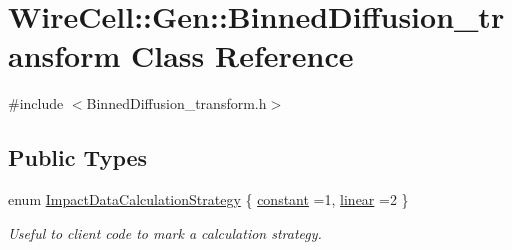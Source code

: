 \hypertarget{class_wire_cell_1_1_gen_1_1_binned_diffusion__transform}{}\section{Wire\+Cell\+:\+:Gen\+:\+:Binned\+Diffusion\+\_\+transform Class Reference}
\label{class_wire_cell_1_1_gen_1_1_binned_diffusion__transform}


{\ttfamily \#include $<$Binned\+Diffusion\+\_\+transform.\+h$>$}

\subsection*{Public Types}
\begin{DoxyCompactItemize}
\item 
enum \hyperlink{class_wire_cell_1_1_gen_1_1_binned_diffusion__transform_af412f1b73b13a90b066cb7284735ddf8}{Impact\+Data\+Calculation\+Strategy} \{ \hyperlink{class_wire_cell_1_1_gen_1_1_binned_diffusion__transform_af412f1b73b13a90b066cb7284735ddf8a99ec31c36d9e2273b7dfac22cb4cf9c5}{constant} =1, 
\hyperlink{class_wire_cell_1_1_gen_1_1_binned_diffusion__transform_af412f1b73b13a90b066cb7284735ddf8aaac1a1f642137ad29456e098e82c7b6e}{linear} =2
 \}\begin{DoxyCompactList}\small\item\em Useful to client code to mark a calculation strategy. \end{DoxyCompactList}
\end{DoxyCompactItemize}
